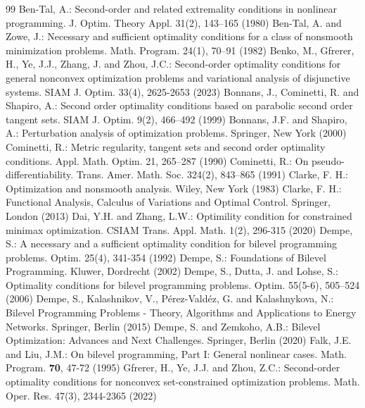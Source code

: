 \documentclass[11pt]{article}
\theoremstyle{definition}
\theoremstyle{remark}
\numberwithin{equation}{section}
\begin{document}
\begin{thebibliography}{99}
 Ben-Tal, A.: Second-order and related extremality conditions in nonlinear programming. J. Optim. Theory Appl. {31}(2), 143–165 (1980)
 Ben-Tal, A. and Zowe, J.: Necessary and sufficient optimality conditions for a class of nonsmooth minimization problems. Math. Program. {24}(1), 70–91 (1982)
 Benko, M., Gfrerer, H., Ye, J.J., Zhang, J. and Zhou, J.C.: Second-order optimality conditions for general nonconvex optimization problems and variational analysis of disjunctive systems. SIAM J. Optim.  {33}(4), 2625-2653 (2023)
     Bonnans, J., Cominetti, R. and Shapiro, A.: Second order optimality conditions based on parabolic second order tangent sets. SIAM J. Optim. {9}(2), 466–492 (1999)
 Bonnans, J.F. and Shapiro, A.: Perturbation analysis of optimization problems. Springer, New York
    (2000)
 Cominetti, R.: Metric regularity, tangent sets and second order optimality conditions. Appl.
Math. Optim. {21}, 265–287 (1990)
 Cominetti, R.: On pseudo-differentiability. Trans. Amer. Math. Soc. {324}(2), 843–865 (1991)
 Clarke, F. H.: Optimization and nonsmooth analysis. Wiley, New York (1983)
Clarke, F. H.: Functional Analysis, Calculus of Variations and Optimal Control.
    Springer, London (2013)
     Dai, Y.H. and Zhang, L.W.: Optimility condition for constrained minimax optimization. CSIAM Trans. Appl. Math. { 1}(2), 296-315 (2020)
Dempe, S.: A necessary and a sufficient optimality condition for bilevel programming problems.
   Optim. { 25}(4), 341-354 (1992)
 Dempe, S.: Foundations of Bilevel Programming. Kluwer, Dordrecht (2002)
Dempe, S., Dutta, J. and Lohse, S.: Optimality conditions for bilevel programming problems. Optim.   {55}(5-6), 505–524 (2006)
     Dempe, S., Kalashnikov, V., Pérez-Valdéz, G. and Kalashnykova, N.: Bilevel Programming
        Problems - Theory, Algorithms and Applications to Energy Networks. Springer, Berlin (2015)
Dempe, S. and Zemkoho, A.B.: Bilevel Optimization: Advances and Next Challenges. Springer, Berlin
   (2020)
Falk, J.E. and Liu, J.M.: On bilevel programming, Part I: General nonlinear cases. Math. Program.
   {\bf 70}, 47-72 (1995)
 Gfrerer, H., Ye, J.J. and Zhou, Z.C.: Second-order optimality conditions for nonconvex set-constrained optimization problems. Math. Oper. Res. {47}(3), 2344-2365 (2022)

\end{thebibliography}
\end{document}
